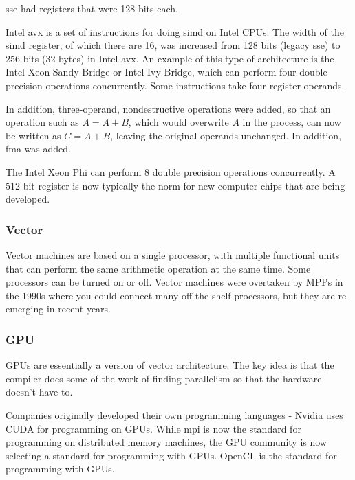 \documentclass[10pt]{article}
\newcounter{subsubsubsection}[subsubsection]
\begin{document}
\begin{flushleft}

\gls{sse} had registers that were 128 bits each. 


Intel \gls{avx} is a set of instructions for doing \gls{simd} on Intel CPUs. The width of the \gls{simd} register, of which there are 16, was increased from 128 bits (legacy \gls{sse}) to 256 bits (32 bytes) in Intel \gls{avx}. An example of this type of architecture is the Intel Xeon Sandy-Bridge or Intel Ivy Bridge, which can perform four double precision operations concurrently. Some instructions take four-register operands. 

In addition, three-operand, nondestructive operations were added, so that an operation such as \(A=A+B\), which would overwrite \(A\) in the process, can now be written as \(C=A+B\), leaving the original operands unchanged. In addition, \gls{fma} was added. 


The Intel Xeon Phi can perform 8 double precision operations concurrently. A 512-bit register is now typically the norm for new computer chips that are being developed.

\subsubsection{Vector}

Vector machines are based on a single processor, with multiple functional units that can perform the same arithmetic operation at the same time. Some processors can be turned on or off. Vector machines were overtaken by MPPs in the 1990s where you could connect many off-the-shelf processors, but they are re-emerging in recent years. 

\subsubsection{GPU}

GPUs are essentially a version of vector architecture. The key idea is that the compiler does some of the work of finding parallelism so that the hardware doesn't have to. 

Companies originally developed their own programming languages - Nvidia uses CUDA for programming on GPUs. While \gls{mpi} is now the standard for programming on distributed memory machines, the GPU community is now selecting a standard for programming with GPUs. OpenCL is the standard for programming with GPUs. 


\end{flushleft}
\end{document}
